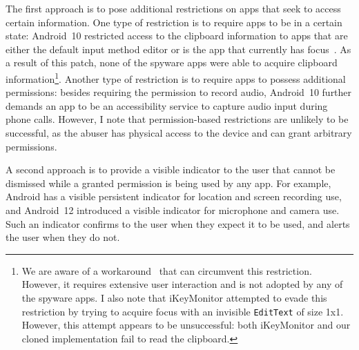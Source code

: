 The first approach is to pose additional restrictions on apps that seek to access certain information. One type of restriction is to require apps to be in a certain state: Android~10 restricted access to the clipboard information
to apps that are either the default input
method editor or is the app that currently has focus~\cite{Privacyc52:online}. As a result of this
patch, none of the spyware apps were able to acquire clipboard information\footnote{We are aware of a workaround~\cite{SolvedCl34:online} that can circumvent this restriction. However, it requires extensive user interaction and is not adopted by any of the spyware apps. I also note
that iKeyMonitor
attempted to evade this restriction by trying to acquire focus with an
invisible \texttt{EditText} of size 1x1. However, this attempt appears to be
unsuccessful: both iKeyMonitor and our cloned implementation fail to
read the clipboard.}. Another type of restriction is to require apps to possess additional permissions: besides requiring the permission to record audio, Android~10 further demands an app to be an accessibility service to capture audio input during phone calls. However, I note that permission-based restrictions are unlikely to be successful, as the abuser has physical access to the device and can grant arbitrary permissions.

 






A second approach is to provide a visible indicator to the user that cannot be
dismissed while a granted permission is being used by any app.  For example,
Android has a visible persistent indicator for location and screen recording
use, and Android~12 introduced a visible indicator for microphone and camera
use. Such an indicator confirms to the user when they expect it to be used, and
alerts the user when they do not.

